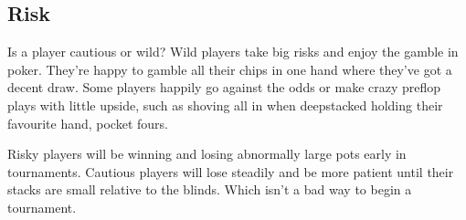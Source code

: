 \subsection{Risk}

Is a player cautious or wild? Wild players take big risks and
enjoy the gamble in poker. They're happy to gamble all their chips
in one hand where they've got a decent draw. Some players happily
go against the odds or make crazy preflop plays with little upside,
such as shoving all in when deepstacked holding their favourite
hand, pocket fours.

Risky players will be winning and losing abnormally large pots
early in tournaments. Cautious players will lose steadily and be
more patient until their stacks are small relative to the blinds.
Which isn't a bad way to begin a tournament.
